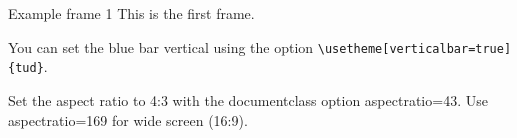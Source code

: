 \begin{frame}[fragile]{Example frame 1} %
    This is the first frame.
    
    You can set the blue bar vertical using the option \verb|\usetheme[verticalbar=true]{tud}|.
    
    Set the aspect ratio to 4:3 with the
    documentclass option aspectratio=43. Use aspectratio=169 for wide screen (16:9).
    \end{frame}